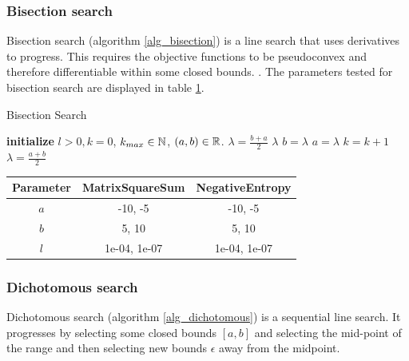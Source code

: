 \documentclass[english, 12pt, a4paper, sci, utf8, a-1b, online, table]{aaltothesis}
\newcommand{\abs}[1]{\ensuremath|#1|}
\newcommand{\R}{\ensuremath\mathbb{R}}
\newcommand{\N}{\ensuremath\mathbb{N}}
\begin{document}
\subsubsection{Bisection search}


Bisection search (algorithm \ref{alg_bisection}) is a line search that uses derivatives to progress. This requires the objective functions to be pseudoconvex and therefore differentiable within some closed bounds. \cite{book:nonlinear_programming}. The parameters tested for bisection search are displayed in table \ref{tab:params_BisectionSearch}.

\begin{algorithm}[H]
\caption{Bisection Search}
\label{alg_bisection}
\begin{algorithmic}[1]
\STATE \textbf{initialize} $l > 0, k = 0$, $k_{max} \in \N$, $(a, b) \in \R$.
\WHILE{$\abs{b - a} > l$ \AND $k < k_{max}$}
    \STATE $\lambda = \frac{b + a}{2}$
        \RETURN $\lambda$
        \STATE $b = \lambda$
    \ELSE
        \STATE $a = \lambda$
    \ENDIF
    \STATE $k = k + 1$
\ENDWHILE
\RETURN $\lambda = \frac{a + b}{2}$
\end{algorithmic}
\end{algorithm}

\begin{table}[H]
\label{tab:params_BisectionSearch}
\centering
{}
\begin{tabular}{|c|c|c|}
\hline
\rowcolor{gray!25}
Parameter & MatrixSquareSum & NegativeEntropy \\
\hline
$a$ & -10, -5 & -10, -5 \\
$b$ & 5, 10 & 5, 10 \\
$l$ & 1e-04, 1e-07 & 1e-04, 1e-07 \\
\hline
\end{tabular}
\end{table}


\subsubsection{Dichotomous search}


Dichotomous search (algorithm \ref{alg_dichotomous}) is a sequential line search. It progresses by selecting some closed bounds $[a, b]$ and selecting the mid-point of the range and then selecting new bounds $\epsilon$ away from the midpoint. \cite{book:nonlinear_programming}
\end{document}
